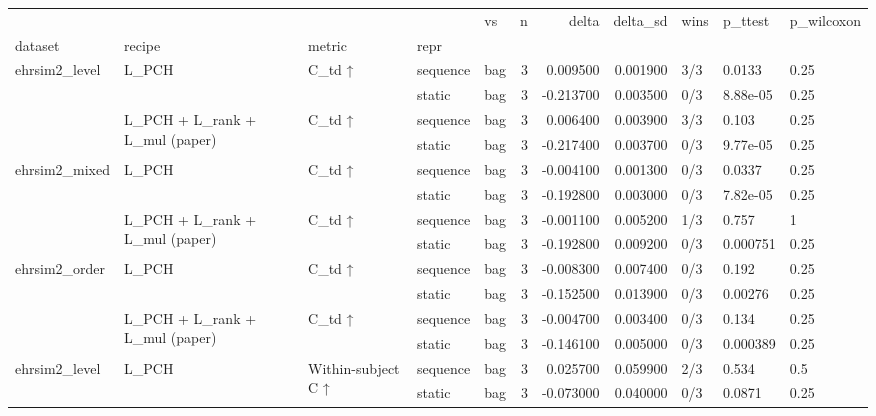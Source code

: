 \begin{tabular}{lllllrrrlll}
\toprule
 &  &  &  & vs & n & delta & delta\_sd & wins & p\_ttest & p\_wilcoxon \\
dataset & recipe & metric & repr &  &  &  &  &  &  &  \\
\midrule
\multirow[t]{4}{*}{ehrsim2\_level} & \multirow[t]{2}{*}{L\_PCH} & \multirow[t]{2}{*}{C\_td ↑} & sequence & bag & 3 & 0.009500 & 0.001900 & 3/3 & 0.0133 & 0.25 \\
 &  &  & static & bag & 3 & -0.213700 & 0.003500 & 0/3 & 8.88e-05 & 0.25 \\
\cline{2-11} \cline{3-11}
 & \multirow[t]{2}{*}{L\_PCH + L\_rank + L\_mul (paper)} & \multirow[t]{2}{*}{C\_td ↑} & sequence & bag & 3 & 0.006400 & 0.003900 & 3/3 & 0.103 & 0.25 \\
 &  &  & static & bag & 3 & -0.217400 & 0.003700 & 0/3 & 9.77e-05 & 0.25 \\
\cline{1-11} \cline{2-11} \cline{3-11}
\multirow[t]{4}{*}{ehrsim2\_mixed} & \multirow[t]{2}{*}{L\_PCH} & \multirow[t]{2}{*}{C\_td ↑} & sequence & bag & 3 & -0.004100 & 0.001300 & 0/3 & 0.0337 & 0.25 \\
 &  &  & static & bag & 3 & -0.192800 & 0.003000 & 0/3 & 7.82e-05 & 0.25 \\
\cline{2-11} \cline{3-11}
 & \multirow[t]{2}{*}{L\_PCH + L\_rank + L\_mul (paper)} & \multirow[t]{2}{*}{C\_td ↑} & sequence & bag & 3 & -0.001100 & 0.005200 & 1/3 & 0.757 & 1 \\
 &  &  & static & bag & 3 & -0.192800 & 0.009200 & 0/3 & 0.000751 & 0.25 \\
\cline{1-11} \cline{2-11} \cline{3-11}
\multirow[t]{4}{*}{ehrsim2\_order} & \multirow[t]{2}{*}{L\_PCH} & \multirow[t]{2}{*}{C\_td ↑} & sequence & bag & 3 & -0.008300 & 0.007400 & 0/3 & 0.192 & 0.25 \\
 &  &  & static & bag & 3 & -0.152500 & 0.013900 & 0/3 & 0.00276 & 0.25 \\
\cline{2-11} \cline{3-11}
 & \multirow[t]{2}{*}{L\_PCH + L\_rank + L\_mul (paper)} & \multirow[t]{2}{*}{C\_td ↑} & sequence & bag & 3 & -0.004700 & 0.003400 & 0/3 & 0.134 & 0.25 \\
 &  &  & static & bag & 3 & -0.146100 & 0.005000 & 0/3 & 0.000389 & 0.25 \\
\cline{1-11} \cline{2-11} \cline{3-11}
\multirow[t]{4}{*}{ehrsim2\_level} & \multirow[t]{2}{*}{L\_PCH} & \multirow[t]{2}{*}{Within-subject C ↑} & sequence & bag & 3 & 0.025700 & 0.059900 & 2/3 & 0.534 & 0.5 \\
 &  &  & static & bag & 3 & -0.073000 & 0.040000 & 0/3 & 0.0871 & 0.25 \\

\end{tabular}
